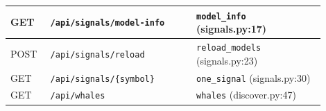{\begin{longtable}{|>{\centering\arraybackslash}p{0.11\linewidth}|p{0.42\linewidth}|p{0.37\linewidth}|}
GET & \texttt{/\allowbreak{}api/\allowbreak{}signals/\allowbreak{}model-info} & \texttt{model\_\allowbreak{}info} (signals.py:17)\\\hline
POST & \texttt{/\allowbreak{}api/\allowbreak{}signals/\allowbreak{}reload} & \texttt{reload\_\allowbreak{}models} (signals.py:23)\\\hline
GET & \texttt{/\allowbreak{}api/\allowbreak{}signals/\allowbreak{}\{symbol\}} & \texttt{one\_\allowbreak{}signal} (signals.py:30)\\\hline
GET & \texttt{/\allowbreak{}api/\allowbreak{}whales} & \texttt{whales} (discover.py:47)\\\hline
\end{longtable}}
